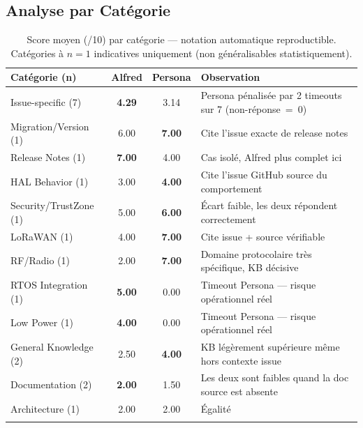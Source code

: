 \subsection{Analyse par Catégorie}

\begin{longtable}{p{3.6cm}ccp{6cm}}
\toprule
\textbf{Catégorie (n)} & \textbf{Alfred} & \textbf{Persona} & \textbf{Observation} \\
\midrule
Issue-specific (7) & \textbf{4.29} & 3.14 & Persona pénalisée par 2 timeouts sur 7 (non-réponse~=~0) \\
Migration/Version (1) & 6.00 & \textbf{7.00} & Cite l'issue exacte de release notes \\
Release Notes (1) & \textbf{7.00} & 4.00 & Cas isolé, Alfred plus complet ici \\
HAL Behavior (1) & 3.00 & \textbf{4.00} & Cite l'issue GitHub source du comportement \\
Security/TrustZone (1) & 5.00 & \textbf{6.00} & Écart faible, les deux répondent correctement \\
LoRaWAN (1) & 4.00 & \textbf{7.00} & Cite issue + source vérifiable \\
RF/Radio (1) & 2.00 & \textbf{7.00} & Domaine protocolaire très spécifique, KB décisive \\
RTOS Integration (1) & \textbf{5.00} & 0.00 & Timeout Persona --- risque opérationnel réel \\
Low Power (1) & \textbf{4.00} & 0.00 & Timeout Persona --- risque opérationnel réel \\
General Knowledge (2) & 2.50 & \textbf{4.00} & KB légèrement supérieure même hors contexte issue \\
Documentation (2) & \textbf{2.00} & 1.50 & Les deux sont faibles quand la doc source est absente \\
Architecture (1) & 2.00 & 2.00 & Égalité \\
\bottomrule
\caption{Score moyen (/10) par catégorie --- notation automatique reproductible. Catégories à $n=1$ indicatives uniquement (non généralisables statistiquement).}
\label{tab:comparative_categories}
\end{longtable}

